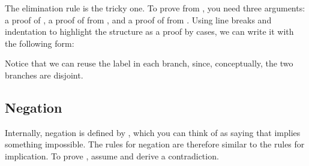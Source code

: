 \documentclass[letterpaper,10pt,english]{sphinxmanual}
\begin{document}
\sphinxAtStartPar
The elimination rule is the tricky one. To prove  from , you need three arguments: a proof  of , a proof of  from , and a proof of  from . Using line breaks and indentation to highlight the structure as a proof by cases, we can write it with the following form:

\begin{sphinxVerbatim}[commandchars=\\\{\}]
               
   
 
      
        
      
        
\end{sphinxVerbatim}

\sphinxAtStartPar
Notice that we can reuse the label  in each branch, since, conceptually, the two branches are disjoint.


\subsection{Negation}
\label{\detokenize{propositional_logic_in_lean:negation}}
\sphinxAtStartPar
Internally, negation  is defined by , which you can think of as saying that  implies something impossible. The rules for negation are therefore similar to the rules for implication. To prove , assume  and derive a contradiction.

\begin{sphinxVerbatim}[commandchars=\\\{\}]
    
    
   
\end{sphinxVerbatim}
\end{document}
